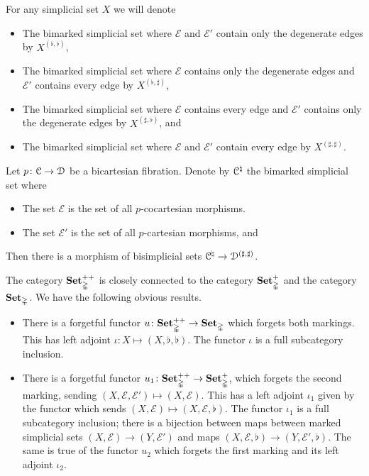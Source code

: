 \documentclass[main.tex]{subfiles}
\begin{document}
\begin{example}
  For any simplicial set $X$ we will denote
  \begin{itemize}
    \item The bimarked simplicial set where $\mathcal{E}$ and $\mathcal{E}'$ contain only the degenerate edges by $X^{( \flat, \flat )}$,

    \item The bimarked simplicial set where $\mathcal{E}$ contains only the degenerate edges and $\mathcal{E}'$ contains every edge by $X^{( \flat, \sharp )}$,

    \item The bimarked simplicial set where $\mathcal{E}$ contains every edge and $\mathcal{E}'$ contains only the degenerate edges by $X^{( \sharp, \flat )}$, and

    \item The bimarked simplicial set where $\mathcal{E}$ and $\mathcal{E}'$ contain every edge by $X^{( \sharp, \sharp )}$.
  \end{itemize}
\end{example}

\begin{example}
  \label{eg:bicartesian_marking}
  Let $p\colon \mathcal{C} \to \mathcal{D}$ be a bicartesian fibration. Denote by $\mathcal{C}^{\natural}$ the bimarked simplicial set where
  \begin{itemize}
    \item The set $\mathcal{E}$ is the set of all $p$-cocartesian morphisms.

    \item The set $\mathcal{E}'$ is the set of all $p$-cartesian morphisms, and
  \end{itemize}

  Then there is a morphism of bisimplicial sets $\mathcal{C}^{\natural} \to \mathcal{D}^{(\sharp, \sharp)}$.
\end{example}

The category $\mathbf{Set}_{\mathbb{\Delta}}^{++}$ is closely connected to the category $\mathbf{Set}_{\mathbb{\Delta}}^{+}$ and the category $\mathbf{Set}_{\mathbb{\Delta}}$. We have the following obvious results.
\begin{itemize}
  \item There is a forgetful functor $u\colon \mathbf{Set}_{\mathbb{\Delta}}^{++} \to \mathbf{Set}_{\mathbb{\Delta}}$ which forgets both markings. This has left adjoint $\iota\colon X \mapsto (X, \flat, \flat)$. The functor $\iota$ is a full subcategory inclusion.

  \item There is a forgetful functor $u_{1}\colon \mathbf{Set}_{\mathbb{\Delta}}^{++} \to \mathbf{Set}_{\mathbb{\Delta}}^{+}$, which forgets the second marking, sending $(X, \mathcal{E}, \mathcal{E}') \mapsto (X, \mathcal{E})$. This has a left adjoint $\iota_{1}$ given by the functor which sends $(X, \mathcal{E}) \mapsto (X, \mathcal{E}, \flat)$. The functor $\iota_{1}$ is a full subcategory inclusion; there is a bijection between maps between marked simplicial sets $(X, \mathcal{E}) \to (Y, \mathcal{E}')$ and maps $(X, \mathcal{E}, \flat) \to (Y, \mathcal{E}', \flat)$. The same is true of the functor $u_{2}$ which forgets the first marking and its left adjoint $\iota_{2}$.
\end{itemize}
\end{document}
